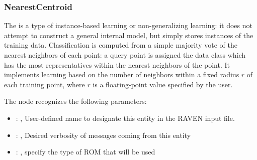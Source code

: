 \subsubsection{NearestCentroid}
  The  is a type of instance-based learning or
  non-generalizing learning: it does not attempt to construct a general internal
  model, but simply stores instances of the training data.                          Classification
  is computed from a simple majority vote of the nearest neighbors                          of each
  point: a query point is assigned the data class which has the most
  representatives within the nearest neighbors of the point.                          It implements
  learning based on the number of neighbors within a fixed radius                          $r$ of
  each training point, where $r$ is a floating-point value specified by the
  user.                          

  The  node recognizes the following parameters:
    \begin{itemize}
      \item {}: ,
        User-defined name to designate this entity in the RAVEN input file.
      \item {}: ,
        Desired verbosity of messages coming from this entity
      \item {}: ,
        specify the type of ROM that will be used
  \end{itemize}

